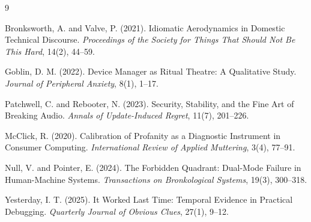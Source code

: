 \documentclass[10pt,twocolumn]{article}
\begin{document}
\begin{thebibliography}{9}

Bronksworth, A. and Valve, P. (2021).
\newblock Idiomatic Aerodynamics in Domestic Technical Discourse.
\newblock \emph{Proceedings of the Society for Things That Should Not Be This Hard}, 14(2), 44--59.

Goblin, D. M. (2022).
\newblock Device Manager as Ritual Theatre: A Qualitative Study.
\newblock \emph{Journal of Peripheral Anxiety}, 8(1), 1--17.

Patchwell, C. and Rebooter, N. (2023).
\newblock Security, Stability, and the Fine Art of Breaking Audio.
\newblock \emph{Annals of Update-Induced Regret}, 11(7), 201--226.

McClick, R. (2020).
\newblock Calibration of Profanity as a Diagnostic Instrument in Consumer Computing.
\newblock \emph{International Review of Applied Muttering}, 3(4), 77--91.

Null, V. and Pointer, E. (2024).
\newblock The Forbidden Quadrant: Dual-Mode Failure in Human-Machine Systems.
\newblock \emph{Transactions on Bronkological Systems}, 19(3), 300--318.

Yesterday, I. T. (2025).
\newblock It Worked Last Time: Temporal Evidence in Practical Debugging.
\newblock \emph{Quarterly Journal of Obvious Clues}, 27(1), 9--12.

\end{thebibliography}
\end{document}
